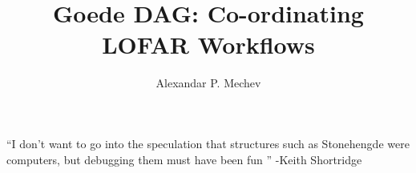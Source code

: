 \documentclass[8pt,a5paper,twoside,openright]{book}
\begin{document}
\title{\LARGE {\bf Goede DAG: Co-ordinating LOFAR Workflows}\\
 \vspace*{6mm}
}

\author{Alexandar P. Mechev}

\normallinespacing
\maketitle
\onehalfspacing

\preface





\body
``I don't want to go into the speculation that structures such as Stonehengde were computers, but debugging them must have been fun '' -Keith Shortridge

















{}
%	
\printbibliography
\end{document}
